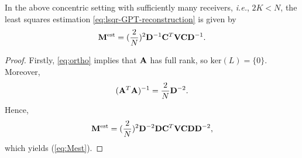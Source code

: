 \begin{lemma}\label{lemma:inv} In the above concentric setting with sufficiently many receivers, \emph{i.e.},
 $2K < N$, the least squares estimation \eqref{eq:lsqr-GPT-reconstruction} is given by
\begin{equation}
\mathbf{M}^{\mathrm{est}} = (\frac{2}{N})^2 \mathbf{D}^{-1} \mathbf{C}^T
\mathbf{V} \mathbf{C} \mathbf{D}^{-1}. \label{eq:Mest}
\end{equation}
\end{lemma}
\begin{proof} Firstly, \eqref{eq:ortho} implies that $\mathbf{A}$ has full rank,
so $\mathrm{ker }(L) =\{0\}$. Moreover, $$ (\mathbf{A}^T \mathbf{A})^{-1}
= \frac{2}{N} \mathbf{D}^{-2}.$$ Hence,
$$
\mathbf{M}^{\mathrm{est}} = (\frac{2}{N})^2 \mathbf{D}^{-2} \mathbf{D}
\mathbf{C}^T \mathbf{V} \mathbf{C} \mathbf{D} \mathbf{D}^{-2},
$$
which yields (\ref{eq:Mest}).
\end{proof}

